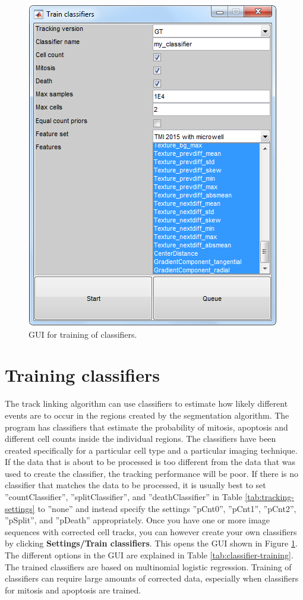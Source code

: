 \documentclass[a4paper, oneside, onecolumn, 11pt]{article}
\newcommand{\menu}[1]{\textbf{#1}}
\newcommand{\setting}[1]{''#1''}
\begin{document}
\begin{figure}[!htb]
\begin{center}
\includegraphics[width = 0.5\columnwidth]{figures/classifierTrainingGUI}
\caption{GUI for training of classifiers.}
\label{fig:classifier-training-GUI}
\end{center}
\end{figure}

\section{Training classifiers}
\label{sec:training-classifiers}
The track linking algorithm can use classifiers to estimate how likely different events are to occur in the regions created by the segmentation algorithm. The program has classifiers that estimate the probability of mitosis, apoptosis and different cell counts inside the individual regions. The classifiers have been created specifically for a particular cell type and a particular imaging technique. If the data that is about to be processed is too different from the data that was used to create the classifier, the tracking performance will be poor. If there is no classifier that matches the data to be processed, it is usually best to set \setting{countClassifier}, \setting{splitClassifier}, and \setting{deathClassifier} in Table \ref{tab:tracking-settings} to \setting{none} and instead specify the settings \setting{pCnt0}, \setting{pCnt1}, \setting{pCnt2}, \setting{pSplit}, and \setting{pDeath} appropriately. Once you have one or more image sequences with corrected cell tracks, you can however create your own classifiers by clicking \menu{Settings/\allowbreak Train classifiers}. This opens the GUI shown in Figure \ref{fig:classifier-training-GUI}. The different options in the GUI are explained in Table \ref{tab:classifier-training}. The trained classifiers are based on multinomial logistic regression. Training of classifiers can require large amounts of corrected data, especially when classifiers for mitosis and apoptosis are trained.
\end{document}
